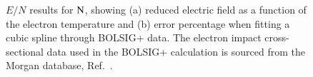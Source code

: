 \begin{figure}[h]
\caption{$E/N$ results for $\rm N$, showing (a) reduced electric field as a function of the electron temperature and (b) error percentage when fitting a cubic spline through BOLSIG+ data. The electron impact cross-sectional data used in the BOLSIG+ calculation is sourced from the Morgan database, Ref.\ \cite{lxc:2024:morgan}.}
\label{fig:electronimpact_4}
\end{figure}
%
